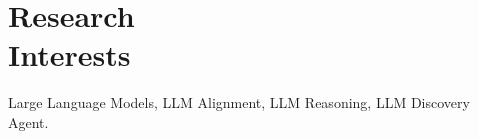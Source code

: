 \section{Research \\ Interests}


\noindent Large Language Models, LLM Alignment, LLM Reasoning, LLM Discovery Agent. \\
